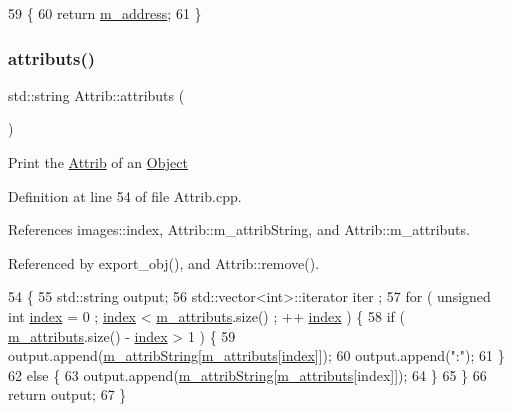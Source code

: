 \begin{DoxyCode}
59                \{
60     \textcolor{keywordflow}{return} \hyperlink{classIOdata_a965810e1888b904c575277f50cea734a}{m\_address};
61   \}
\end{DoxyCode}
\mbox{\label{classAttrib_aee7bbf16b144887f196e1341b24f8a26}} 
\subsubsection{\texorpdfstring{attributs()}{attributs()}}
{\footnotesize\ttfamily std\+::string Attrib\+::attributs (\begin{DoxyParamCaption}{ }\end{DoxyParamCaption})\hspace{0.3cm}{\ttfamily [inherited]}}

Print the \hyperlink{classAttrib}{Attrib} of an \hyperlink{classObject}{Object} 

Definition at line 54 of file Attrib.\+cpp.



References images\+::index, Attrib\+::m\+\_\+attrib\+String, and Attrib\+::m\+\_\+attributs.



Referenced by export\+\_\+obj(), and Attrib\+::remove().


\begin{DoxyCode}
54                             \{
55   std::string output;
56   std::vector<int>::iterator iter ;
57   \textcolor{keywordflow}{for} ( \textcolor{keywordtype}{unsigned} \textcolor{keywordtype}{int} \hyperlink{namespaceimages_a54407fd574970b3178647ae096321a57}{index} = 0 ; \hyperlink{namespaceimages_a54407fd574970b3178647ae096321a57}{index} < \hyperlink{classAttrib_ac4bd58a0cc6b38a3b711d609a3d3aacc}{m\_attributs}.size() ; ++
      \hyperlink{namespaceimages_a54407fd574970b3178647ae096321a57}{index} ) \{
58     \textcolor{keywordflow}{if} ( \hyperlink{classAttrib_ac4bd58a0cc6b38a3b711d609a3d3aacc}{m\_attributs}.size() - \hyperlink{namespaceimages_a54407fd574970b3178647ae096321a57}{index} > 1 ) \{
59       output.append(\hyperlink{classAttrib_a3414521d7a82476e874b25a5407b5e63}{m\_attribString}[\hyperlink{classAttrib_ac4bd58a0cc6b38a3b711d609a3d3aacc}{m\_attributs}[\hyperlink{namespaceimages_a54407fd574970b3178647ae096321a57}{index}]]);
60       output.append(\textcolor{stringliteral}{":"});
61     \}
62     \textcolor{keywordflow}{else} \{
63       output.append(\hyperlink{classAttrib_a3414521d7a82476e874b25a5407b5e63}{m\_attribString}[\hyperlink{classAttrib_ac4bd58a0cc6b38a3b711d609a3d3aacc}{m\_attributs}[index]]);
64     \}
65   \}
66   \textcolor{keywordflow}{return} output;
67 \}
\end{DoxyCode}
\mbox{\label{classIOdata_aeda27840c9a9b7b3b86efc71c56cd868}} 
